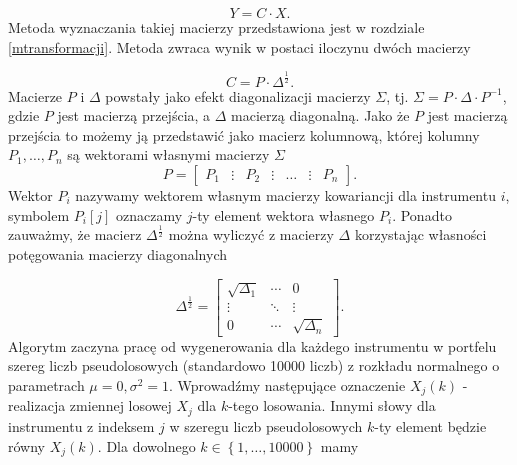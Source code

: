 \documentclass[12pt,titlepage]{article}
\numberwithin{equation}{section}
\begin{document}
\begin{equation}
    Y=C \cdot X.
\end{equation}
Metoda wyznaczania takiej macierzy przedstawiona jest w rozdziale \ref{mtransformacji}. Metoda zwraca wynik w postaci iloczynu dwóch macierzy

\begin{equation}
    C=P \cdot \Delta^{\frac{1}{2}}.
\end{equation}
Macierze $P$ i $\Delta$ powstały jako efekt diagonalizacji macierzy $\Sigma$, tj. $\Sigma=P \cdot \Delta \cdot P^{-1}$, gdzie  $P$ jest macierzą przejścia, a $\Delta$ macierzą diagonalną. Jako że $P$ jest macierzą przejścia to możemy ją przedstawić jako macierz kolumnową, której kolumny $P_1, \hdots, P_n$ są wektorami własnymi macierzy $\Sigma$
\begin{equation}
    P=\begin{bmatrix} P_1 & \vdots & P_2 & \vdots  & \hdots & \vdots & P_n \end{bmatrix}.
\end{equation}
Wektor $P_i$ nazywamy wektorem własnym macierzy kowariancji dla instrumentu $i$, symbolem $P_{i}[j]$ oznaczamy $j$-ty element wektora własnego $P_i$. Ponadto zauważmy, że macierz $\Delta^{\frac{1}{2}}$ można wyliczyć z macierzy $\Delta$ korzystając własności potęgowania macierzy diagonalnych



\begin{equation}
\Delta^{\frac{1}{2}}=\begin{bmatrix} \sqrt{\Delta_1} &  \cdots &0 \\
\vdots & \ddots  & \vdots \\ 0& \cdots & \sqrt{\Delta_n} \end{bmatrix}.
\end{equation} 
Algorytm zaczyna pracę od wygenerowania dla każdego instrumentu w portfelu szereg liczb pseudolosowych (standardowo 10000 liczb) z rozkładu normalnego o parametrach $\mu=0,\sigma^2=1$. Wprowadźmy następujące oznaczenie $X_j(k)$ - realizacja zmiennej losowej $X_j$ dla $k$-tego losowania. Innymi słowy dla instrumentu z indeksem $j$ w szeregu liczb pseudolosowych $k$-ty element będzie równy $X_j(k)$. Dla dowolnego $k \in \left \{1, \hdots, 10000 \right \} $ mamy
\end{document}
